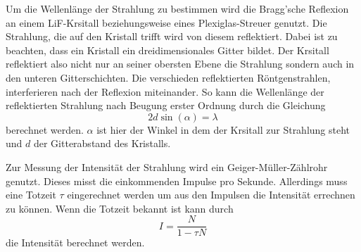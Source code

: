 Um die Wellenlänge der Strahlung zu bestimmen wird die Bragg'sche Reflexion an einem LiF-Krsitall beziehungsweise eines Plexiglas-Streuer genutzt.
Die Strahlung, die auf den Kristall trifft wird von diesem reflektiert.
Dabei ist zu beachten, dass ein Kristall ein dreidimensionales Gitter bildet.
Der Krsitall reflektiert also nicht nur an seiner obersten Ebene die Strahlung sondern auch in den unteren Gitterschichten.
Die verschieden reflektierten Röntgenstrahlen, interferieren nach der Reflexion miteinander.
So kann die Wellenlänge der reflektierten Strahlung nach Beugung erster Ordnung durch die Gleichung
\begin{equation}
    2 d \sin(\alpha) = \lambda
    \label{eq:bragg}
\end{equation}
berechnet werden.
$\alpha$ ist hier der Winkel in dem der Krsitall zur Strahlung steht und $d$ der Gitterabstand des Kristalls.

Zur Messung der Intensität der Strahlung wird ein Geiger-Müller-Zählrohr genutzt.
Dieses misst die einkommenden Impulse pro Sekunde.
Allerdings muss eine Totzeit $\tau$ eingerechnet werden um aus den Impulsen die Intensität errechnen zu können.
Wenn die Totzeit bekannt ist kann durch 
\begin{equation}
    I = \frac{N}{1-\tau N}
    \label{eq:intens}
\end{equation}
die Intensität berechnet werden.
